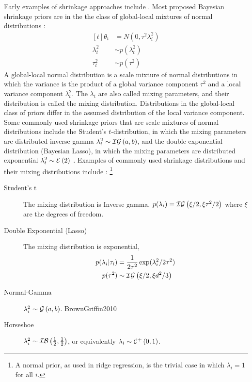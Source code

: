 \documentclass{article}
\begin{document}
Early examples of shrinkage approaches include \parencites{Tibshirani1996}{Tipping2001}.
Most proposed Bayesian shrinkage priors are in the the class of global-local mixtures of normal distributions \parencite{PolsonScott2010}:
\begin{equation}
  \label{eq:3}
  \begin{aligned}[t]
    \theta_{t} &= N(0, \tau^{2} \lambda_{i}^{2}) \\ 
    \lambda_{t}^{2} &\sim p(\lambda_{t}^{2}) \\
    \tau_{t}^{2} &\sim p(\tau^{2})
  \end{aligned}
\end{equation}
A global-local normal distribution is a scale mixture of normal distributions in which the variance is the product of a global variance component $\tau^{2}$ and a local variance component $\lambda_{t}^{2}$.
The $\lambda_t$ are also called mixing parameters, and their distribution is called the mixing distribution.
Distributions in the global-local class of priors differ in the assumed distribution of the local variance component.%
Some commonly used shrinkage priors that are scale mixtures of normal distributions include the Student's $t$-distribution, in which the mixing parameters are distributed inverse gamma $\lambda^{2}_{t} \sim \mathcal{IG}\left(a, b\right)$, and the double exponential distribution (Bayesian Lasso), in which the mixing parameters are distributed exponential $\lambda^{2}_{t} \sim \mathcal{E}\left(2\right)$ \parencite[74]{CarvalhoPolsonScott2009}.
Examples of commonly used shrinkage distributions and their mixing distributions include \textcite{PolsonScott2010}:%
\footnote{A normal prior, as used in ridge regression, is the trivial case in which $\lambda_{i} = 1$ for all $i$.}
\begin{description}
\item[Student's t] The mixing distribution is Inverse gamma, $p(\lambda_{i}) = \mathcal{IG}\left(\xi / 2, \xi \tau^{2} / 2\right)$ where $\xi$ are the degrees of freedom. \parencite{Tipping2001}
\item[Double Exponential (Lasso)] The mixing distribution is exponential,
  \begin{equation*}
    \begin{aligned}[t]
      p(\lambda_{i} | \tau_{i}) &= \frac{1}{2 \tau^{2}} \exp (\lambda_{i}^{2} / 2 \tau^{2}) \\
      p(\tau^{2}) &\sim \mathcal{IG}\left(\xi / 2, \xi d^{2} / 3\right)
    \end{aligned}
  \end{equation*}
\item[Normal-Gamma] $\lambda^{2}_{i} \sim \mathcal{G}\left(a, b\right)$. \parencite{CaronDoucet2008}{BrownGriffin2010}
\item[Horseshoe] $\lambda^{2}_{i} \sim \mathcal{IB}\left(\frac{1}{2}, \frac{1}{2}\right)$, or equivalently $\lambda_{i} \sim \mathcal{C}^{+}\left(0, 1\right)$. \parencite{CarvalhoPolsonScott2010}
\end{description}
\end{document}
